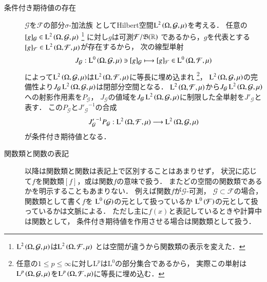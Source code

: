 \begin{description}
	\item[条件付き期待値の存在]
		$\mathcal{G}$を$\mathcal{F}$の部分$\sigma$-加法族
		としてHilbert空間$\operatorname{L}^{2} \left(\Omega, \mathcal{G},\mu\right)$を考える．
		任意の$[g]_{\mathcal{G}} \in \operatorname{L}^{2} \left(\Omega, \mathcal{G},\mu\right)$
		\footnote{
			$\operatorname{L}^{2} \left(\Omega, \mathcal{G},\mu\right)$は$\operatorname{L}^{2} \left(\Omega, \mathcal{F},\mu\right)$
			とは空間が違うから関数類の表示を変えた．
		}
		に対し$g$は可測$\mathcal{F}/\mathfrak{B}(\mathbb{R})$
		であるから，$g$を代表とする$[g]_{\mathcal{F}} \in \operatorname{L}^{2} \left(\Omega, \mathcal{F},\mu\right)$が存在するから，
		次の線型単射
		\begin{align}
			J_{\mathcal{G}}:\operatorname{L}^{0} \left(\Omega, \mathcal{G},\mu\right) \ni [g]_{\mathcal{G}} \longmapsto [g]_{\mathcal{F}} \in \operatorname{L}^{0} \left(\Omega, \mathcal{F},\mu\right)
			\label{eq:Lp_sp_embedding}
		\end{align}
		によって$\operatorname{L}^{2} \left(\Omega, \mathcal{G},\mu\right)$は$\operatorname{L}^{2} \left(\Omega, \mathcal{F},\mu\right)$に等長に埋め込まれ
		\footnote{
			任意の$1 \leq p \leq \infty$に対し$\mathrm{L}^{p}$は$\mathrm{L}^{0}$の部分集合であるから，
			実際この単射は$\operatorname{L}^{p} \left(\Omega, \mathcal{G},\mu\right)$を$\operatorname{L}^{p} \left(\Omega, \mathcal{F},\mu\right)$に等長に埋め込む．
		}，
		$\operatorname{L}^{2} \left(\Omega, \mathcal{G},\mu\right)$の完備性より$J_{\mathcal{G}} \operatorname{L}^{2} \left(\Omega, \mathcal{G},\mu\right)$は閉部分空間となる．
		$\operatorname{L}^{2} \left(\Omega, \mathcal{F},\mu\right)$から$J_{\mathcal{G}} \operatorname{L}^{2} \left(\Omega, \mathcal{G},\mu\right)$への射影作用素を$P_\mathcal{G}$，
		$J_{\mathcal{G}}$の値域を$J_{\mathcal{G}} \operatorname{L}^{2} \left(\Omega, \mathcal{G},\mu\right)$に制限した全単射を$J'_{\mathcal{G}}$と表す．
		この$P_{\mathcal{G}}$と${J'_{\mathcal{G}}}^{-1}$の合成
		\begin{align}
			{J'_{\mathcal{G}}}^{-1} P_{\mathcal{G}}:\operatorname{L}^{2} \left(\Omega, \mathcal{F},\mu\right) \longrightarrow \operatorname{L}^{2} \left(\Omega, \mathcal{G},\mu\right)
			\label{eq:composition_L2_conditional_expectation}
		\end{align}
		が条件付き期待値となる．
		
	\item[関数類と関数の表記]
		以降は関数類と関数は表記上で区別することはあまりせず，
		状況に応じて$f$を関数類$[f]$，或は関数$f$の意味で扱う．
		またどの空間の関数類であるかを明示することもあまりない．
		例えば関数$f$が$\mathcal{G}$-可測，
		$\mathcal{G} \subset \mathcal{F}$の場合，関数類として書く$f$を
		$\operatorname{L}^{0} \left(\mathcal{G}\right)$の元として扱っているか
		$\operatorname{L}^{0} \left(\mathcal{F}\right)$の元として扱っているかは文脈による．
		ただし主に$f(x)$と表記しているときや計算中は関数として，
		条件付き期待値を作用させる場合は関数類として扱う．
	\end{description}
	
